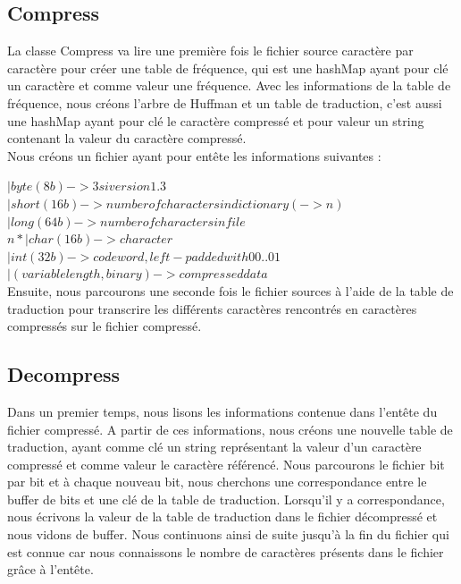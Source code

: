 \documentclass[10pt,a4paper]{article}
\begin{document}
\subsection*{Compress}
La classe Compress va lire une première fois le fichier source caractère par caractère pour créer une table de fréquence, qui est une hashMap ayant pour clé un caractère et comme valeur une fréquence. Avec les informations de la table de fréquence, nous créons l'arbre de Huffman et un table de traduction, c'est aussi une hashMap ayant pour clé le caractère compressé et pour valeur un string contenant la valeur du caractère compressé. \\
Nous créons un fichier ayant pour entête les informations suivantes :

$| byte (8b) -> 3 si version 1.3$ \\
 $ | short (16b) -> number of characters in dictionary (->n)$\\
 $ | long (64b) -> number of characters in file $\\
$    n*| char (16b) -> character $\\
  $    | int (32b) -> codeword, left-padded with 00..01 $\\
 $ | (variable length, binary) -> compressed data $\\

Ensuite, nous parcourons une seconde fois le fichier sources à l'aide de la table de traduction pour transcrire les différents caractères rencontrés en caractères compressés sur le fichier compressé.

\subsection*{Decompress}

Dans un premier temps, nous lisons les informations contenue dans l'entête du fichier compressé. A partir de ces informations, nous créons une nouvelle table de traduction, ayant comme clé un string représentant la valeur d'un caractère compressé et comme valeur le caractère référencé. Nous parcourons le fichier bit par bit et à chaque nouveau bit, nous cherchons une correspondance entre le buffer de bits et une clé de la table de traduction. Lorsqu'il y a correspondance, nous écrivons la valeur de la table de traduction dans le fichier décompressé et nous vidons de buffer. Nous continuons ainsi de suite jusqu'à la fin du fichier qui est connue car nous connaissons le nombre de caractères présents dans le fichier grâce à l'entête.
\end{document}
